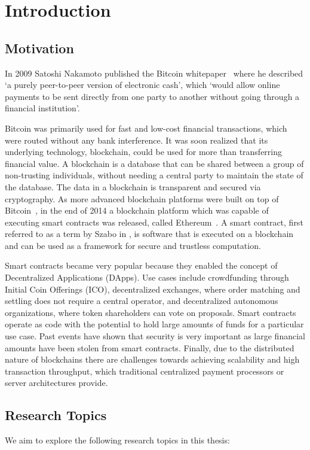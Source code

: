 \chapter{Introduction}

\section{Motivation}
In 2009 Satoshi Nakamoto published the Bitcoin whitepaper~\cite{bitcoin} where he described `a purely peer-to-peer version of electronic cash', which `would allow online payments to be sent directly from one party to another without going through a financial institution'.

Bitcoin was primarily used for fast and low-cost financial transactions, which were routed without any bank interference. It was soon realized that its underlying technology, blockchain, could be used for more than transferring financial value. A blockchain is a database that can be shared between a group of non-trusting individuals, without needing a central party to maintain the state of the database. The data in a blockchain is transparent and secured via cryptography. As more advanced blockchain platforms were built on top of Bitcoin~\cite{colored}, in the end of 2014 a blockchain platform which was capable of executing smart contracts was released, called Ethereum~\cite{vitalik}. A smart contract, first referred to as a term by Szabo in \cite{szabo}, is software that is executed on a blockchain and can be used as a framework for secure and trustless computation.

Smart contracts became very popular because they enabled the concept of Decentralized Applications (DApps). Use cases include crowdfunding through Initial Coin Offerings (ICO), decentralized exchanges, where order matching and settling does not require a central operator, and decentralized autonomous organizations, where token shareholders can vote on proposals. Smart contracts operate as code with the potential to hold large amounts of funds for a particular use case. Past events have shown that security is very important as large financial amounts have been stolen from smart contracts. Finally, due to the distributed nature of blockchains there are challenges towards achieving scalability and high transaction throughput, which traditional centralized payment processors or server architectures provide.

\section{Research Topics}
We aim to explore the following research topics in this thesis:

